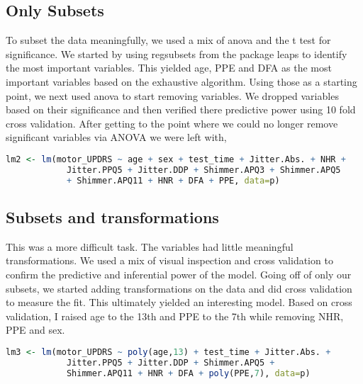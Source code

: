 \documentclass{article}
\begin{document}
\subsection{Only Subsets}
To subset the data meaningfully, we used a mix of anova and the t test for significance.  We started by using regsubsets from the package leaps to identify the most important variables. This yielded age, PPE and DFA as the most important variables based on the exhaustive algorithm. Using those as a starting point, we next used anova to start removing variables. We dropped variables based on their significance and then verified there predictive power using 10 fold cross validation.  After getting to the point where we could no longer remove significant variables via ANOVA we were left with,
\begin{lstlisting}[language=R]
lm2 <- lm(motor_UPDRS ~ age + sex + test_time + Jitter.Abs. + NHR +
            Jitter.PPQ5 + Jitter.DDP + Shimmer.APQ3 + Shimmer.APQ5 
            + Shimmer.APQ11 + HNR + DFA + PPE, data=p)
\end{lstlisting}

\subsection{Subsets and transformations}
This was a more difficult task.  The variables had little meaningful transformations. We used a mix of visual inspection and cross validation to confirm the predictive and inferential power of the model.  Going off of only our subsets, we started adding transformations on the data and did cross validation to measure the fit.  This ultimately yielded an interesting model.  Based on cross validation, I raised age to the 13th and PPE to the 7th while removing NHR, PPE and sex. 
\begin{lstlisting}[language=R]
lm3 <- lm(motor_UPDRS ~ poly(age,13) + test_time + Jitter.Abs. +
            Jitter.PPQ5 + Jitter.DDP + Shimmer.APQ5 +
            Shimmer.APQ11 + HNR + DFA + poly(PPE,7), data=p)
\end{lstlisting}
\end{document}
